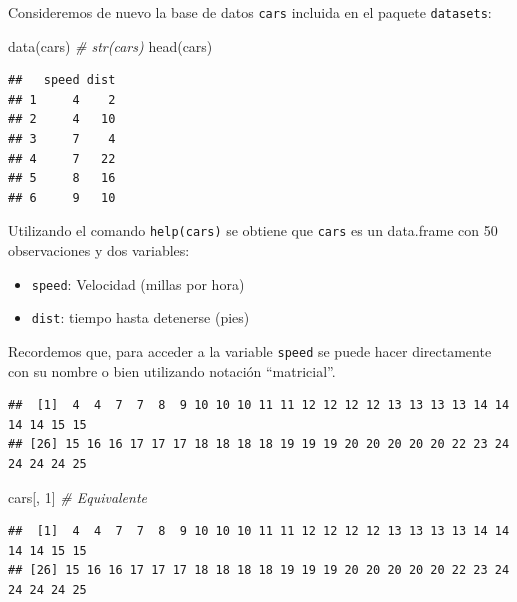 \documentclass[
]{book}
\newenvironment{Shaded}{\begin{snugshade}}{\end{snugshade}}
\newcommand{\CommentTok}[1]{\textcolor[rgb]{0.56,0.35,0.01}{\textit{#1}}}
\newcommand{\DecValTok}[1]{\textcolor[rgb]{0.00,0.00,0.81}{#1}}
\newcommand{\FunctionTok}[1]{\textcolor[rgb]{0.00,0.00,0.00}{#1}}
\newcommand{\NormalTok}[1]{#1}
\newcommand{\SpecialCharTok}[1]{\textcolor[rgb]{0.00,0.00,0.00}{#1}}
\theoremstyle{break}
\begin{document}
Consideremos de nuevo la
base de datos \texttt{cars} incluida en el paquete \texttt{datasets}:

\begin{Shaded}
\begin{Highlighting}[]
\FunctionTok{data}\NormalTok{(cars)}
\CommentTok{\# str(cars)}
\FunctionTok{head}\NormalTok{(cars)}
\end{Highlighting}
\end{Shaded}

\begin{verbatim}
##   speed dist
## 1     4    2
## 2     4   10
## 3     7    4
## 4     7   22
## 5     8   16
## 6     9   10
\end{verbatim}

Utilizando el comando \texttt{help(cars)}
se obtiene que \texttt{cars} es un data.frame con 50 observaciones y dos
variables:

\begin{itemize}
\item
  \texttt{speed}: Velocidad (millas por hora)
\item
  \texttt{dist}: tiempo hasta detenerse (pies)
\end{itemize}

Recordemos que, para acceder a la variable \texttt{speed} se puede
hacer directamente con su nombre o bien utilizando notación
``matricial''.

\begin{Shaded}
\end{Shaded}

\begin{verbatim}
##  [1]  4  4  7  7  8  9 10 10 10 11 11 12 12 12 12 13 13 13 13 14 14 14 14 15 15
## [26] 15 16 16 17 17 17 18 18 18 18 19 19 19 20 20 20 20 20 22 23 24 24 24 24 25
\end{verbatim}

\begin{Shaded}
\begin{Highlighting}[]
\NormalTok{cars[, }\DecValTok{1}\NormalTok{]  }\CommentTok{\# Equivalente}
\end{Highlighting}
\end{Shaded}

\begin{verbatim}
##  [1]  4  4  7  7  8  9 10 10 10 11 11 12 12 12 12 13 13 13 13 14 14 14 14 15 15
## [26] 15 16 16 17 17 17 18 18 18 18 19 19 19 20 20 20 20 20 22 23 24 24 24 24 25
\end{verbatim}
\end{document}
